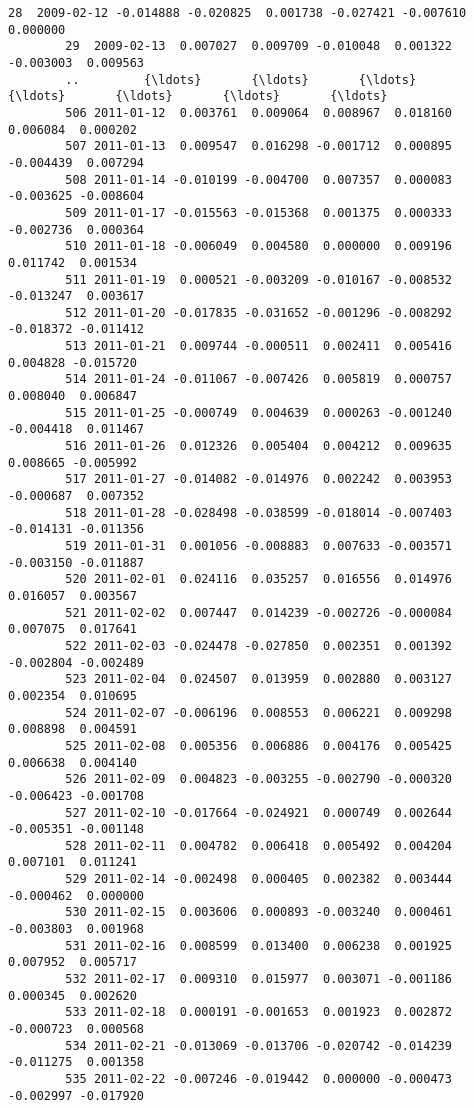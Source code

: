 \documentclass[11pt]{article}
\begin{document}
\begin{Verbatim}[commandchars=\\\{\}]
        28  2009-02-12 -0.014888 -0.020825  0.001738 -0.027421 -0.007610  0.000000   
        29  2009-02-13  0.007027  0.009709 -0.010048  0.001322 -0.003003  0.009563   
        ..         {\ldots}       {\ldots}       {\ldots}       {\ldots}       {\ldots}       {\ldots}       {\ldots}   
        506 2011-01-12  0.003761  0.009064  0.008967  0.018160  0.006084  0.000202   
        507 2011-01-13  0.009547  0.016298 -0.001712  0.000895 -0.004439  0.007294   
        508 2011-01-14 -0.010199 -0.004700  0.007357  0.000083 -0.003625 -0.008604   
        509 2011-01-17 -0.015563 -0.015368  0.001375  0.000333 -0.002736  0.000364   
        510 2011-01-18 -0.006049  0.004580  0.000000  0.009196  0.011742  0.001534   
        511 2011-01-19  0.000521 -0.003209 -0.010167 -0.008532 -0.013247  0.003617   
        512 2011-01-20 -0.017835 -0.031652 -0.001296 -0.008292 -0.018372 -0.011412   
        513 2011-01-21  0.009744 -0.000511  0.002411  0.005416  0.004828 -0.015720   
        514 2011-01-24 -0.011067 -0.007426  0.005819  0.000757  0.008040  0.006847   
        515 2011-01-25 -0.000749  0.004639  0.000263 -0.001240 -0.004418  0.011467   
        516 2011-01-26  0.012326  0.005404  0.004212  0.009635  0.008665 -0.005992   
        517 2011-01-27 -0.014082 -0.014976  0.002242  0.003953 -0.000687  0.007352   
        518 2011-01-28 -0.028498 -0.038599 -0.018014 -0.007403 -0.014131 -0.011356   
        519 2011-01-31  0.001056 -0.008883  0.007633 -0.003571 -0.003150 -0.011887   
        520 2011-02-01  0.024116  0.035257  0.016556  0.014976  0.016057  0.003567   
        521 2011-02-02  0.007447  0.014239 -0.002726 -0.000084  0.007075  0.017641   
        522 2011-02-03 -0.024478 -0.027850  0.002351  0.001392 -0.002804 -0.002489   
        523 2011-02-04  0.024507  0.013959  0.002880  0.003127  0.002354  0.010695   
        524 2011-02-07 -0.006196  0.008553  0.006221  0.009298  0.008898  0.004591   
        525 2011-02-08  0.005356  0.006886  0.004176  0.005425  0.006638  0.004140   
        526 2011-02-09  0.004823 -0.003255 -0.002790 -0.000320 -0.006423 -0.001708   
        527 2011-02-10 -0.017664 -0.024921  0.000749  0.002644 -0.005351 -0.001148   
        528 2011-02-11  0.004782  0.006418  0.005492  0.004204  0.007101  0.011241   
        529 2011-02-14 -0.002498  0.000405  0.002382  0.003444 -0.000462  0.000000   
        530 2011-02-15  0.003606  0.000893 -0.003240  0.000461 -0.003803  0.001968   
        531 2011-02-16  0.008599  0.013400  0.006238  0.001925  0.007952  0.005717   
        532 2011-02-17  0.009310  0.015977  0.003071 -0.001186  0.000345  0.002620   
        533 2011-02-18  0.000191 -0.001653  0.001923  0.002872 -0.000723  0.000568   
        534 2011-02-21 -0.013069 -0.013706 -0.020742 -0.014239 -0.011275  0.001358   
        535 2011-02-22 -0.007246 -0.019442  0.000000 -0.000473 -0.002997 -0.017920   
        

\end{Verbatim}
\end{document}
